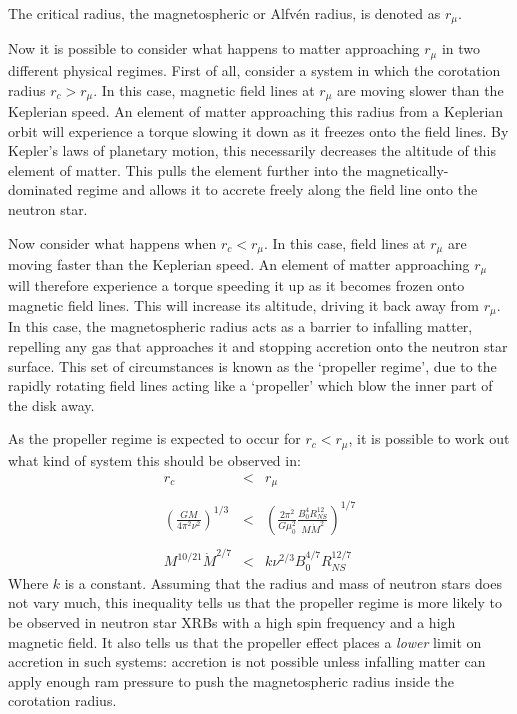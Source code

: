 The critical radius, the magnetospheric or Alfv\'en radius, is denoted as $r_\mu$.
\par Now it is possible to consider what happens to matter approaching $r_\mu$ in two different physical regimes.  First of all, consider a system in which the corotation radius $r_c>r_\mu$.  In this case, magnetic field lines at $r_\mu$ are moving slower than the Keplerian speed.  An element of matter approaching this radius from a Keplerian orbit will experience a torque slowing it down as it freezes onto the field lines.  By Kepler's laws of planetary motion, this necessarily decreases the altitude of this element of matter.  This pulls the element further into the magnetically-dominated regime and allows it to accrete freely along the field line onto the neutron star.
\par Now consider what happens when $r_c<r_\mu$.  In this case, field lines at $r_\mu$ are moving faster than the Keplerian speed.  An element of matter approaching $r_\mu$ will therefore experience a torque speeding it up as it becomes frozen onto magnetic field lines.  This will increase its altitude, driving it back away from $r_\mu$.  In this case, the magnetospheric radius acts as a barrier to infalling matter, repelling any gas that approaches it and stopping accretion onto the neutron star surface.  This set of circumstances is known as the `propeller regime', due to the rapidly rotating field lines acting like a `propeller' which blow the inner part of the disk away.
\par As the propeller regime is expected to occur for $r_c<r_\mu$, it is possible to work out what kind of system this should be observed in:
\begin{eqnarray}
r_c&<&r_\mu\\ \nonumber \\
\left(\frac{GM}{4\pi^2\nu^2}\right)^{1/3}&<&\left(\frac{2\pi^2}{G\mu_0^2}\frac{B_0^4R_{NS}^{12}}{M\dot{M}^2}\right)^{1/7}\\ \nonumber \\
M^{10/21}\dot{M}^{2/7}&<&k\nu^{2/3}B_0^{4/7}R_{NS}^{12/7}
\end{eqnarray}
Where $k$ is a constant.  Assuming that the radius and mass of neutron stars does not vary much, this inequality tells us that the propeller regime is more likely to be observed in neutron star XRBs with a high spin frequency and a high magnetic field.  It also tells us that the propeller effect places a \textit{lower} limit on accretion in such systems: accretion is not possible unless infalling matter can apply enough ram pressure to push the magnetospheric radius inside the corotation radius.
